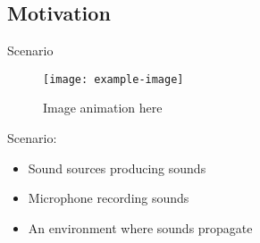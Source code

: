 \subsection{Motivation}

\begin{frame}{Scenario}

    \begin{figure}
        \texttt{[image: example-image]}
        \caption{Image animation here}
    \end{figure}


    \begin{block}{Scenario:}
        \begin{itemize}
            \item Sound sources producing sounds
            \item Microphone recording sounds
            \item An environment where sounds propagate
        \end{itemize}

    \end{block}

\end{frame}

